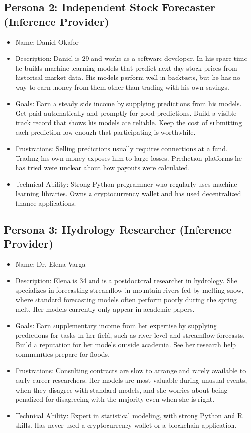 \documentclass[12pt]{article}
\begin{document}
\subsection{Persona 2: Independent Stock Forecaster (Inference Provider)}
\begin{itemize}
\item Name: Daniel Okafor
\item Description: Daniel is 29 and works as a software developer. In his spare time he builds machine learning models that predict next-day stock prices from historical market data. His models perform well in backtests, but he has no way to earn money from them other than trading with his own savings.
\item Goals: Earn a steady side income by supplying predictions from his models. Get paid automatically and promptly for good predictions. Build a visible track record that shows his models are reliable. Keep the cost of submitting each prediction low enough that participating is worthwhile.
\item Frustrations: Selling predictions usually requires connections at a fund. Trading his own money exposes him to large losses. Prediction platforms he has tried were unclear about how payouts were calculated.
\item Technical Ability: Strong Python programmer who regularly uses machine learning libraries. Owns a cryptocurrency wallet and has used decentralized finance applications.
\end{itemize}

\subsection{Persona 3: Hydrology Researcher (Inference Provider)}
\begin{itemize}
\item Name: Dr. Elena Varga
\item Description: Elena is 34 and is a postdoctoral researcher in hydrology. She specializes in forecasting streamflow in mountain rivers fed by melting snow, where standard forecasting models often perform poorly during the spring melt. Her models currently only appear in academic papers.
\item Goals: Earn supplementary income from her expertise by supplying predictions for tasks in her field, such as river-level and streamflow forecasts. Build a reputation for her models outside academia. See her research help communities prepare for floods.
\item Frustrations: Consulting contracts are slow to arrange and rarely available to early-career researchers. Her models are most valuable during unusual events, when they disagree with standard models, and she worries about being penalized for disagreeing with the majority even when she is right.
\item Technical Ability: Expert in statistical modeling, with strong Python and R skills. Has never used a cryptocurrency wallet or a blockchain application.
\end{itemize}
\end{document}

